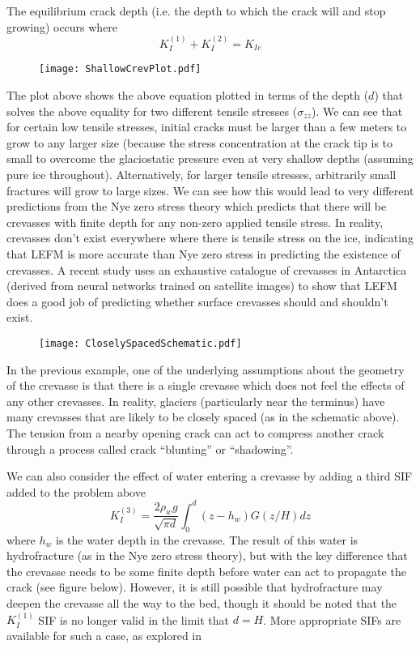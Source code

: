 \documentclass[12pt]{article}
\theoremstyle{definition}
\begin{document}
The equilibrium crack depth (i.e. the depth to which the crack will and stop growing) occurs where
\begin{equation}
K_I^{(1)} + K_I^{(2)} = K_{Ic}
\end{equation}
\begin{figure}[h]
  \begin{center}
\texttt{[image: ShallowCrevPlot.pdf]}
  \end{center}
\end{figure}
The plot above shows the above equation plotted in terms of the depth ($d$) that solves the above equality for two different tensile stresses ($\sigma_{zz}$). We can see that for certain low tensile stresses, initial cracks must be larger than a few meters to grow to any larger size (because the stress concentration at the crack tip is to small to overcome the glaciostatic pressure even at very shallow depths (assuming pure ice throughout). Alternatively, for larger tensile stresses, arbitrarily small fractures will grow to large sizes. We can see how this would lead to very different predictions from the Nye zero stress theory which predicts that there will be crevasses with finite depth for any non-zero applied tensile stress. In reality, crevasses don't exist everywhere where there is tensile stress on the ice, indicating that LEFM is more accurate than Nye zero stress in predicting the existence of crevasses. A recent study \cite[]{lai2020} uses an exhaustive catalogue of crevasses in Antarctica (derived from neural networks trained on satellite images) to show that LEFM does a good job of predicting whether surface crevasses should and shouldn't exist.
\begin{figure}[h]
  \begin{center}
\texttt{[image: CloselySpacedSchematic.pdf]}
  \end{center}
\end{figure}
In the previous example, one of the underlying assumptions about the geometry of the crevasse is that there is a single crevasse which does not feel the effects of any other crevasses. In reality, glaciers (particularly near the terminus) have many crevasses that are likely to be closely spaced (as in the schematic above). The tension from a nearby opening crack can act to compress another crack through a process called crack ``blunting'' or ``shadowing''. 

We can also consider the effect of water entering a crevasse by adding a third SIF added to the problem above
\begin{equation}
K_I^{(3)} = \frac{2 \rho_w g}{\sqrt{\pi d}} \int_0^d (z-h_w)  G (z/H) dz
\end{equation}
where $h_w$ is the water depth in the crevasse. The result of this water is hydrofracture (as in the Nye zero stress theory), but with the key difference that the crevasse needs to be some finite depth before water can act to propagate the crack (see figure below). However, it is still possible that hydrofracture may deepen the crevasse all the way to the bed, though it should be noted that the $K_I^{(1)}$ SIF is no longer valid in the limit that $d=H$. More appropriate SIFs are available for such a case, as explored in \cite{jimenez2018}
\end{document}
